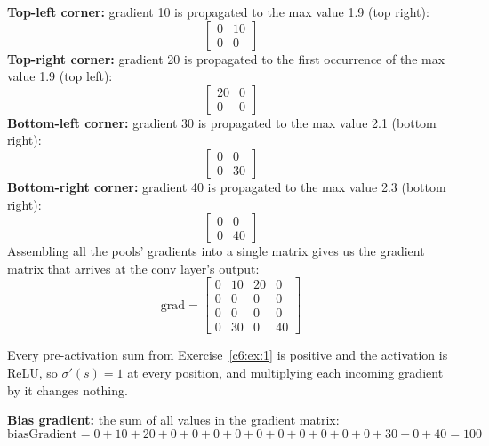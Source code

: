 \textbf{Top-left corner:} gradient 10 is propagated to the max value 1.9 (top right):
\[
  \begin{bmatrix} 0 & 10 \\ 0 & 0 \end{bmatrix}
\]
\textbf{Top-right corner:} gradient 20 is propagated to the first occurrence of the max value 1.9
(top left):
\[
  \begin{bmatrix} 20 & 0 \\ 0 & 0 \end{bmatrix}
\]
\textbf{Bottom-left corner:} gradient 30 is propagated to the max value 2.1 (bottom right):
\[
  \begin{bmatrix} 0 & 0 \\ 0 & 30 \end{bmatrix}
\]
\textbf{Bottom-right corner:} gradient 40 is propagated to the max value 2.3 (bottom right):
\[
  \begin{bmatrix} 0 & 0 \\ 0 & 40 \end{bmatrix}
\]
Assembling all the pools' gradients into a single matrix gives us the gradient matrix that arrives
at the conv layer's output:
\[
  \text{grad} = \begin{bmatrix}
    0 & 10 & 20 & 0 \\
    0 & 0 & 0 & 0 \\
    0 & 0 & 0 & 0 \\
    0 & 30 & 0 & 40
  \end{bmatrix}
\]

Every pre-activation sum from Exercise~\ref{c6:ex:1} is positive and the activation is ReLU, so
$\sigma'(s) = 1$ at every position, and multiplying each incoming gradient by it changes nothing.

\textbf{Bias gradient:} the sum of all values in the gradient matrix:
\[
  \text{biasGradient} = 0 + 10 + 20 + 0 + 0 + 0 + 0 + 0 + 0 + 0 + 0 + 0 + 0 + 30 + 0 + 40 = 100
\]

